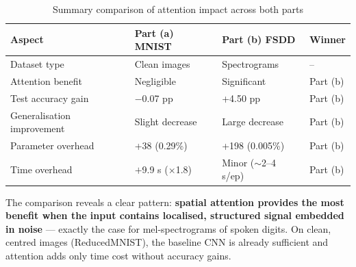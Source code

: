 \documentclass[12pt,a4paper]{article}
\begin{document}
\begin{table}[H]
\centering
\caption{Summary comparison of attention impact across both parts}
\label{tab:cross_comparison}
\begin{tabular}{L{4cm} C{3cm} C{3cm} C{3cm}}
\toprule
{}
\textbf{Aspect} & \textbf{Part (a) MNIST} & \textbf{Part (b) FSDD} & \textbf{Winner} \\
\midrule
Dataset type            & Clean images   & Spectrograms   & -- \\
Attention benefit       & Negligible     & Significant    & Part (b) \\
Test accuracy gain      & $-$0.07 pp     & +4.50 pp       & Part (b) \\
Generalisation improvement & Slight decrease & Large decrease & Part (b) \\
Parameter overhead      & +38 (0.29\%)   & +198 (0.005\%) & Part (b) \\
Time overhead           & $+$9.9 s ($\times$1.8) & Minor ($\sim$2--4 s/ep) & Part (b) \\
\bottomrule
\end{tabular}
\end{table}

The comparison reveals a clear pattern: \textbf{spatial attention provides the most
benefit when the input contains localised, structured signal embedded in noise} —
exactly the case for mel-spectrograms of spoken digits. On clean, centred images
(ReducedMNIST), the baseline CNN is already sufficient and attention adds only
time cost without accuracy gains.
\end{document}
